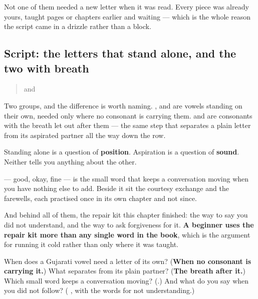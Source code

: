 Not one of them needed a new letter when it was read. Every piece was already yours, taught pages or chapters earlier and waiting — which is the whole reason the script came in a drizzle rather than a block.

\subsection*{Script: the letters that stand alone, and the two with breath}
\begin{quote}
       and     
\end{quote}

Two groups, and the difference is worth naming. \textbf{}, \textbf{} and \textbf{} are vowels standing on their own, needed only where no consonant is carrying them. \textbf{} and \textbf{} are consonants with the breath let out after them — the same step that separates a plain letter from its aspirated partner all the way down the row.

Standing alone is a question of \textbf{position}. Aspiration is a question of \textbf{sound}. Neither tells you anything about the other.

\begin{grammarlens}[title={What you've built — courtesy, farewells, and the kit}]
\textbf{} — good, okay, fine — is the small word that keeps a conversation moving when you have nothing else to add. Beside it sit the courtesy exchange and the farewells, each practised once in its own chapter and not since.

And behind all of them, the repair kit this chapter finished: the way to say you did not understand, and the way to ask forgiveness for it. \textbf{A beginner uses the repair kit more than any single word in the book}, which is the argument for running it cold rather than only where it was taught.
\end{grammarlens}

\begin{tcolorbox}[breakable,colback=teal!4,colframe=teal!35!black,title={Before you move on}]
When does a Gujarati vowel need a letter of its own? (\textbf{When no consonant is carrying it.}) What separates \textbf{} from its plain partner? (\textbf{The breath after it.}) Which small word keeps a conversation moving? (\textbf{}.) And what do you say when you did not follow? (\textbf{ }, with the words for not understanding.)
\end{tcolorbox}
